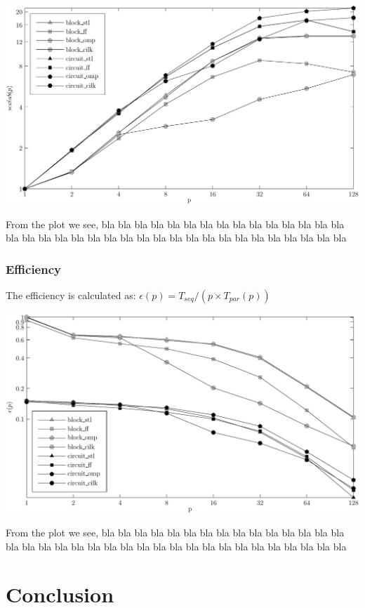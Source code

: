 \documentclass{article}
\begin{document}
\begin{center}
\begin{minipage}{0.9\linewidth}
\includegraphics[width=\linewidth]{img/scalability}
\end{minipage}
\end{center}

From the plot we see,  bla bla bla bla bla bla bla bla bla bla bla bla bla bla bla bla bla bla bla bla bla bla bla bla bla bla bla bla bla bla bla bla bla bla bla bla

\subsubsection{Efficiency}

The efficiency is calculated as: $\epsilon(p) = T_{seq} / (p \times T_{par}(p) )$

\begin{center}
\begin{minipage}{0.9\linewidth}
\includegraphics[width=\linewidth]{img/efficiency}
\end{minipage}
\end{center}

From the plot we see,  bla bla bla bla bla bla bla bla bla bla bla bla bla bla bla bla bla bla bla bla bla bla bla bla bla bla bla bla bla bla bla bla bla bla bla bla

\section{Conclusion}


\end{document}
